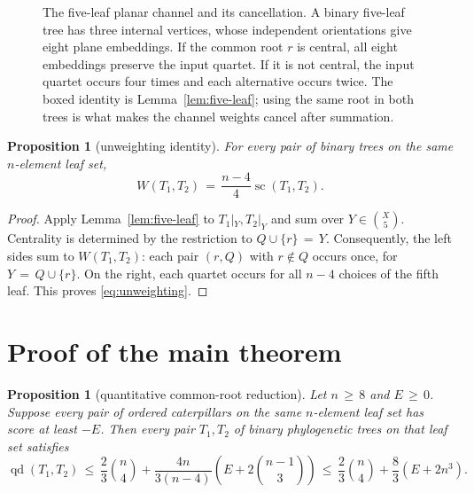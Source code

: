 \documentclass[11pt]{article}
\newtheorem{proposition}[theorem]{Proposition}
\theoremstyle{definition}
\newcommand{\qd}{\operatorname{qd}}
\newcommand{\score}{\operatorname{sc}}
\begin{document}
\begin{figure}[t]
 \caption{The five-leaf planar channel and its cancellation.  A binary
 five-leaf tree has three internal vertices, whose independent orientations
 give eight plane embeddings.  If the common root $r$ is central, all eight
 embeddings preserve the input quartet.  If it is not central, the input
 quartet occurs four times and each alternative occurs twice.  The boxed
 identity is Lemma~\ref{lem:five-leaf}; using the same root in both trees is
 what makes the channel weights cancel after summation.}
 \label{fig:five-leaf-channel}
\end{figure}

\begin{proposition}[unweighting identity]\label{prop:unweighting}
For every pair of binary trees on the same $n$-element leaf set,
\begin{equation}\label{eq:unweighting}
 W(T_1,T_2)\,=\,\frac{n-4}{4}\score(T_1,T_2).
\end{equation}
\end{proposition}

\begin{proof}
Apply Lemma~\ref{lem:five-leaf} to $T_1|_Y,T_2|_Y$ and sum over
$Y\in\binom X5$.  Centrality is determined by the restriction to
$Q\cup\{r\}\,=\,Y$.  Consequently, the left sides sum to $W(T_1,T_2)$:
each pair $(r,Q)$ with $r\notin Q$ occurs once, for
$Y\,=\,Q\cup\{r\}$.  On the right, each quartet occurs for all $n-4$ choices
of the fifth leaf.  This proves \eqref{eq:unweighting}.
\end{proof}

\section{Proof of the main theorem}

\begin{proposition}[quantitative common-root reduction]
\label{prop:common-root-reduction}
Let $n\,\geq\,8$ and $E\,\geq\,0$.  Suppose every pair of ordered caterpillars on the
same $n$-element leaf set has score at least $-E$.  Then every pair
$T_1,T_2$ of binary phylogenetic trees on that leaf set satisfies
\[
 \qd(T_1,T_2)
 \,\leq\,\frac23\binom n4+
 \frac{4n}{3(n-4)}\left(E+2\binom{n-1}{3}\right)
 \,\leq\,\frac23\binom n4+\frac83(E+2n^3).
\]
\end{proposition}
\end{document}
